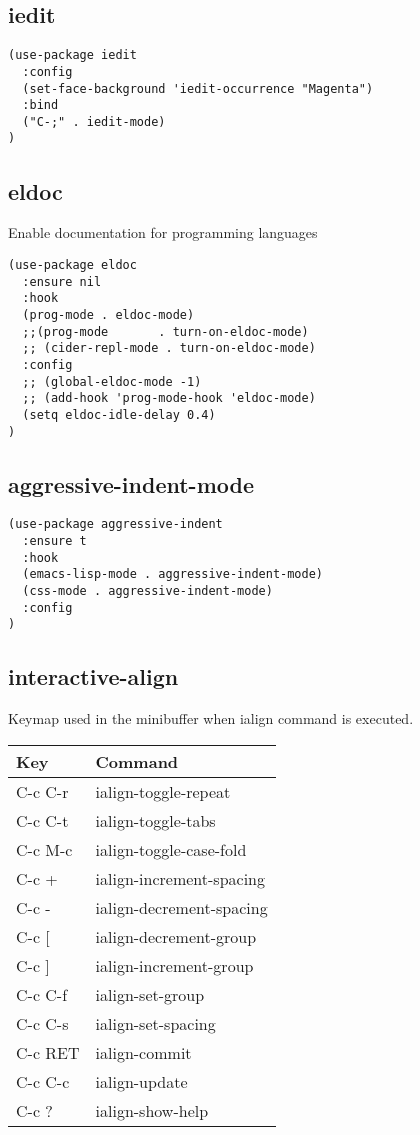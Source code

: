 \documentclass[11pt]{article}
\begin{document}
\subsection*{iedit}
\label{sec:orgbb76244}
\begin{verbatim}
(use-package iedit
  :config
  (set-face-background 'iedit-occurrence "Magenta")
  :bind
  ("C-;" . iedit-mode)
)
\end{verbatim}

\subsection*{eldoc}
\label{sec:org4e08aa1}

Enable documentation for programming languages

\begin{verbatim}
(use-package eldoc
  :ensure nil
  :hook
  (prog-mode . eldoc-mode)
  ;;(prog-mode       . turn-on-eldoc-mode)
  ;; (cider-repl-mode . turn-on-eldoc-mode)
  :config
  ;; (global-eldoc-mode -1)
  ;; (add-hook 'prog-mode-hook 'eldoc-mode)
  (setq eldoc-idle-delay 0.4)
)
\end{verbatim}


\subsection*{aggressive-indent-mode}
\label{sec:org9b5cfc5}

\begin{verbatim}
(use-package aggressive-indent
  :ensure t
  :hook
  (emacs-lisp-mode . aggressive-indent-mode)
  (css-mode . aggressive-indent-mode)
  :config
)
\end{verbatim}

\subsection*{interactive-align}
\label{sec:org111e78c}

Keymap used in the minibuffer when ialign command is executed.
\begin{center}
\begin{tabular}{ll}
\hline
Key & Command\\
\hline
C-c C-r & ialign-toggle-repeat\\
C-c C-t & ialign-toggle-tabs\\
C-c M-c & ialign-toggle-case-fold\\
C-c + & ialign-increment-spacing\\
C-c - & ialign-decrement-spacing\\
C-c [ & ialign-decrement-group\\
C-c ] & ialign-increment-group\\
C-c C-f & ialign-set-group\\
C-c C-s & ialign-set-spacing\\
C-c RET & ialign-commit\\
C-c C-c & ialign-update\\
C-c ? & ialign-show-help\\
\hline
\end{tabular}
\end{center}
\end{document}
